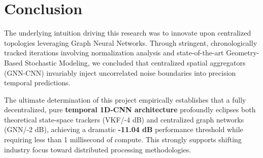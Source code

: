 \documentclass[12pt,a4paper]{article}
\begin{document}
\section{Conclusion}
The underlying intuition driving this research was to innovate upon centralized topologies leveraging Graph Neural Networks. Through stringent, chronologically tracked iterations involving normalization analysis and state-of-the-art Geometry-Based Stochastic Modeling, we concluded that centralized spatial aggregators (GNN-CNN) invariably inject uncorrelated noise boundaries into precision temporal predictions.

The ultimate determination of this project empirically establishes that a fully decentralized, pure \textbf{temporal 1D-CNN architecture} profoundly eclipses both theoretical state-space trackers (VKF/-4 dB) and centralized graph networks (GNN/-2 dB), achieving a dramatic \textbf{-11.04 dB} performance threshold while requiring less than 1 millisecond of compute. This strongly supports shifting industry focus toward distributed processing methodologies.
\end{document}
